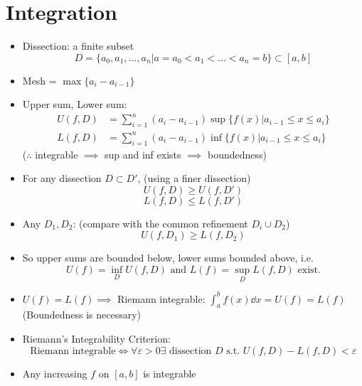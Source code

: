 \section{Integration}
\begin{itemize}
      \item Dissection: a finite subset \[D = \{a_0,a_1,...,a_n|a=a_0<a_1<\dots<a_n =b\} \subset [a,b]\]
      \item Mesh = $\max\{a_i-a_{i-1}\}$
      \item Upper sum, Lower sum:
            \begin{align*}
                  U(f,D) & = \sum_{i=1}^n (a_i-a_{i-1}) \sup\{f(x)|a_{i-1} \leq x \leq a_i\} \\
                  L(f,D) & = \sum_{i=1}^n (a_i-a_{i-1}) \inf\{f(x)|a_{i-1} \leq x \leq a_i\}
            \end{align*}
            ($\therefore$ integrable $\implies$ sup and inf exists $\implies$ boundedness)

      \item For any dissection $D \subset D'$, (using a finer dissection)
            \[U(f,D) \geq U(f,D')\]
            \[L(f,D) \leq L(f,D')\]
      \item Any $D_1,D_2$: (compare with the common refinement $D_i \cup D_2$)
            \[ U(f,D_1) \geq L(f,D_2)\]

      \item So upper sums are bounded below, lower sums bounded above, i.e.
            \[U(f) = \inf_D U(f,D) \text{ and } L(f) = \sup_D L(f,D) \text{ exist.}\]
      \item $U(f) = L(f) \implies$ Riemann integrable: $\int_a ^b f(x) \dd x = U(f) = L(f)$ (Boundedness is necessary)

      \item Riemann's Integrability Criterion: \[\text{Riemann integrable} \iff \forall \varepsilon >0 \exists \text{ dissection }D  \text{ s.t. } U(f,D) - L(f,D) < \varepsilon\]
      \item Any increasing $f$ on $[a,b]$ is integrable
\end{itemize}
